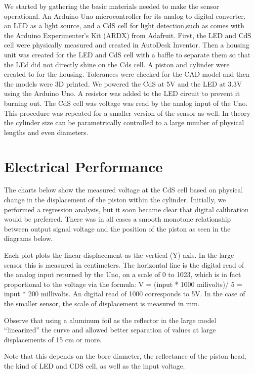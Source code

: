 \documentclass[10pt,conference,compsocconf]{IEEEtran}
\begin{document}
We started by gathering the basic materials needed to make the sensor operational. An Arduino Uno microcontroller for its analog to digital converter, an LED as a light source, and a CdS cell for light detection,such as comes with the Arduino Experimenter’s Kit (ARDX) from Adafruit. First, the LED and CdS cell were physically measured and created in AutoDesk Inventor. Then a housing unit was created for the LED and CdS cell with a baffle to separate them so that the LEd did not directly shine on the Cds cell. A piston and cylinder were created to for the housing. Tolerances were checked for the CAD model and then the models were 3D printed. We powered the CdS at 5V and the LED at 3.3V using the Arduino Uno. A resistor was added to the LED circuit to prevent it burning out. The CdS cell was voltage was read by the analog input of the Uno. This procedure was repeated for a smaller version of the sensor as well. In theory the cylinder size can be parametrically controlled to a large number of physical lengths and even diameters.


\section{Electrical Performance}

The charts below show the measured voltage at the CdS cell based on physical change in the displacement of the piston within the cylinder. Initially, we performed a regression analysis, but it soon became clear that digital calibration would be preferred. There was in all cases a smooth monotone relationship between output signal voltage and the position of the piston as seen in the diagrams below. 

Each plot plots the linear displacement as the vertical (Y) axis. In the large sensor this is measured in centimeters. The horizontal line is the digital read of the analog input returned by the Uno, on a scale of 0 to 1023, which is in fact proportional to the voltage via the formula: V = (input * 1000 milivolts)/ 5 = input * 200 millivolts. An digital read of 1000 corresponds to 5V. In the case of the smaller sensor, the scale of displacement is measured in mm.

Observe that using a aluminum foil as the reflector in the large model “linearized” the curve and allowed better separation of values at large displacements of 15 cm or more.

Note that this depends on the bore diameter, the reflectance of the piston head, the kind of LED and CDS cell, as well as the input voltage.
\end{document}
